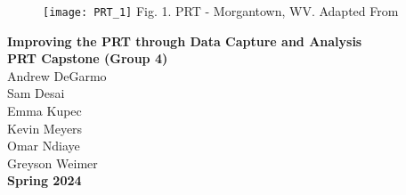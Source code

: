 \begin{titlepage}
    \begin{center}
        \begin{figure}[t]
            \begin{center}
                \texttt{[image: PRT\_1]}
                Fig. 1. PRT - Morgantown, WV. Adapted From \cite{M_2018}
            \end{center}
        \end{figure}
        \fontsize{24}{28}\selectfont
        \textbf{Improving the PRT through Data Capture and Analysis}\\
        \vspace{0.25cm}
        \vspace*{\fill}
        \fontsize{10}{11}\selectfont
        \textbf{PRT Capstone (Group 4)}\\
        Andrew DeGarmo\\
        Sam Desai\\
        Emma Kupec\\
        Kevin Meyers\\
        Omar Ndiaye\\
        Greyson Weimer\\
        \vspace*{\fill}
        \textbf{Spring 2024}\\
    \end{center}
\end{titlepage}